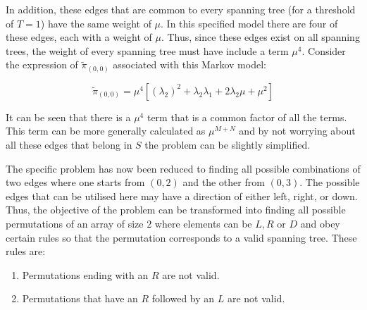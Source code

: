 In addition, these edges that are common to every spanning tree (for a threshold 
of \(T=1\)) have the same weight of \(\mu\). 
In this specified model there are four of these edges, each with a weight of 
\(\mu\). 
Thus, since these edges exist on all spanning trees, the weight of every spanning 
tree must have include a term \(\mu^4\). 
Consider the expression of \(\tilde{\pi}_{(0,0)}\) associated with this Markov 
model:

\begin{equation}\label{eq:pi_00_rate_example}
    \tilde{\pi}_{(0,0)} = \mu^4[(\lambda_2)^2 + \lambda_2 \lambda_1 
    + 2\lambda_2 \mu + \mu^2] 
\end{equation}

It can be seen that there is a \(\mu^4\) term that is a common factor of all the
 terms. 
This term can be more generally calculated as \(\mu^{M+N}\) and by not worrying 
about all these edges that belong in \(S\) the problem can be slightly simplified.

\begin{figure}[H]
    \centering
\end{figure}

The specific problem has now been reduced to finding all possible combinations 
of two edges where one starts from \((0,2)\) and the other from \((0,3)\). 
The possible edges that can be utilised here may have a direction of either 
left, right, or down. 
Thus, the objective of the problem can be transformed into finding all possible 
permutations of an array of size \(2\) where elements can be \(L, R \text{ or } D\)
and obey certain rules so that the permutation corresponds to a valid spanning 
 tree. 
 These rules are:

\begin{enumerate}
    \item Permutations ending with an \(R\) are not valid. \label{rule1}
    \item Permutations that have an \(R\) followed by an \(L\) are not valid. \label{rule2}
\end{enumerate}

